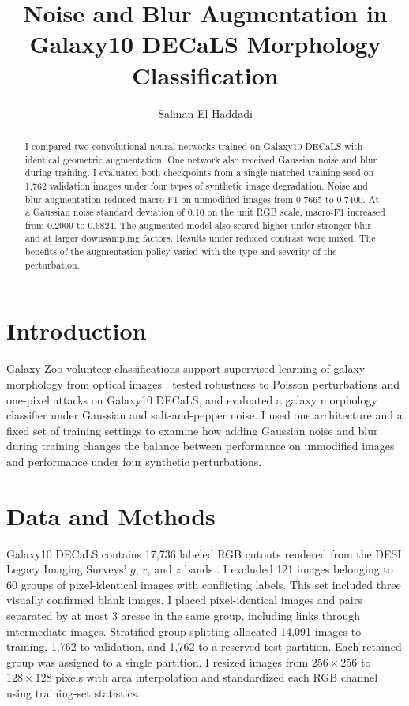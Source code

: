 \documentclass[preprint]{aastex701}
\begin{document}
\title{Noise and Blur Augmentation in Galaxy10 DECaLS Morphology Classification}

\author{Salman El Haddadi}

\begin{abstract}
I compared two convolutional neural networks trained on Galaxy10 DECaLS with identical geometric augmentation. One network also received Gaussian noise and blur during training. I evaluated both checkpoints from a single matched training seed on 1,762 validation images under four types of synthetic image degradation. Noise and blur augmentation reduced macro-F1 on unmodified images from 0.7665 to 0.7400. At a Gaussian noise standard deviation of 0.10 on the unit RGB scale, macro-F1 increased from 0.2909 to 0.6824. The augmented model also scored higher under stronger blur and at larger downsampling factors. Results under reduced contrast were mixed. The benefits of the augmentation policy varied with the type and severity of the perturbation.
\end{abstract}

\section{Introduction}

Galaxy Zoo volunteer classifications support supervised learning of galaxy morphology from optical images \citep{walmsley2022}. \citet{pandya2023} tested robustness to Poisson perturbations and one-pixel attacks on Galaxy10 DECaLS, and \citet{cao2024} evaluated a galaxy morphology classifier under Gaussian and salt-and-pepper noise. I used one architecture and a fixed set of training settings to examine how adding Gaussian noise and blur during training changes the balance between performance on unmodified images and performance under four synthetic perturbations.

\section{Data and Methods}

Galaxy10 DECaLS contains 17,736 labeled RGB cutouts \citep{leung2024} rendered from the DESI Legacy Imaging Surveys' $g$, $r$, and $z$ bands \citep{dey2019}. I excluded 121 images belonging to 60 groups of pixel-identical images with conflicting labels. This set included three visually confirmed blank images. I placed pixel-identical images and pairs separated by at most 3 arcsec in the same group, including links through intermediate images. Stratified group splitting allocated 14,091 images to training, 1,762 to validation, and 1,762 to a reserved test partition. Each retained group was assigned to a single partition. I resized images from $256 \times 256$ to $128 \times 128$ pixels with area interpolation and standardized each RGB channel using training-set statistics.
\end{document}
